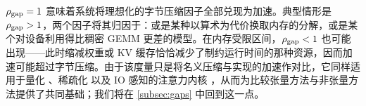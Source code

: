 $\rho_{\rm gap} = 1$ 意味着系统将理想化的字节压缩因子全部兑现为加速。典型情形是 $\rho_{\rm gap} > 1$，两个因子将其归因于：或是某种以算术为代价换取内存的分解，或是某个对设备利用得比稠密 GEMM 更差的模型。在内存受限区间，$\rho_{\rm gap} < 1$ 也可能出现——此时缩减权重或 KV 缓存恰恰减少了制约运行时间的那种资源，因而加速可能超过字节压缩。由于该度量只是将名义压缩与实现的加速作对比，它同样适用于量化 \cite{frantar2023gptq, dettmers2022llmint8, liu2023llmqat}、稀疏化 \cite{frantar2023sparsegpt, ashkboos2024slicegpt} 以及 IO 感知的注意力内核 \cite{dao2022flashattention}，从而为比较张量方法与非张量方法提供了共同基础；我们将在 \cref{subsec:gaps} 中回到这一点。




